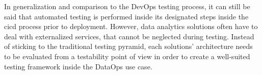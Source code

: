 In generalization and comparison to the DevOps testing process, it can still be said that automated testing is performed inside its designated steps inside the \ac{cicd} process prior to deployment. However, data analytics solutions often have to deal with externalized services, that cannot be neglected during testing. Instead of sticking to the traditional testing pyramid, each solutions' architecture needs to be evaluated from a testability point of view in order to create a well-suited testing framework inside the DataOps use case.



